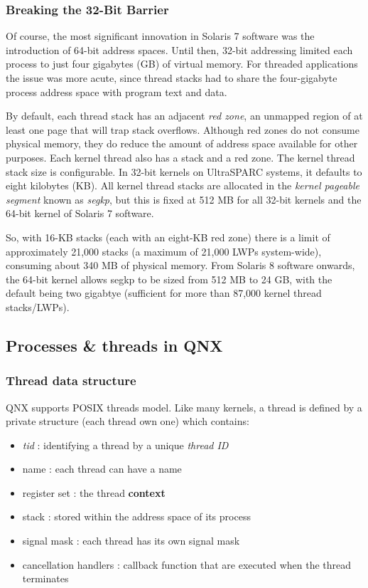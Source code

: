 
\begin{frame}
\frametitle{Breaking the 32-Bit Barrier}

Of course, the most significant innovation in Solaris 7 software was the introduction of 64-bit address spaces. Until then, 32-bit addressing limited each process to just four gigabytes (GB) of virtual memory. For threaded applications the issue was more acute, since thread stacks had to share the four-gigabyte process address space with program text and data.

\-

By default, each thread stack has an adjacent \textit{red zone}, an unmapped region of at least one page that will trap stack overflows. Although red zones do not consume physical memory, they do reduce the amount of address space available for other purposes. Each kernel thread also has a stack and a red zone. The kernel thread stack size is configurable. In 32-bit kernels on UltraSPARC systems, it defaults to eight kilobytes (KB).  All kernel thread stacks are allocated in the \textit{kernel pageable segment} known as \textit{segkp}, but this is fixed at 512 MB for all 32-bit kernels and the 64-bit kernel of Solaris 7 software.

\-

So, with 16-KB stacks (each with an eight-KB red zone) there is a limit of approximately 21,000 stacks (a maximum of 21,000 LWPs system-wide), consuming about 340 MB of physical memory. From Solaris 8 software onwards, the 64-bit kernel allows segkp to be sized from 512 MB to 24 GB, with the default being two gigabtye (sufficient for more than 87,000 kernel thread stacks/LWPs).

\end{frame}


\subsection{Processes \& threads in QNX}


\begin{frame}
\frametitle{Thread data structure}

QNX supports POSIX threads model. Like many kernels, a thread is defined by a private structure (each thread own one) which contains:

\-

\begin{itemize}
\item
\textit{tid} : identifying a thread by a unique \textit{thread ID}
\item
name : each thread can have a name
\item
register set : the thread \textbf{context}
\item
stack : stored within the address space of its process
\item
signal mask : each thread has its own signal mask
\item
cancellation handlers : callback function that are executed when the thread terminates
\end{itemize}

\end{frame}

